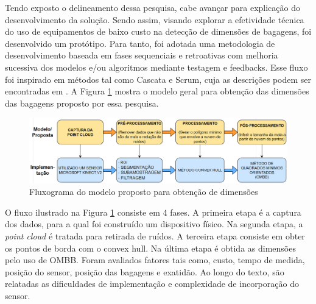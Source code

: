 
    Tendo exposto o delineamento dessa pesquisa, cabe avançar para explicação do desenvolvimento da solução. Sendo assim, visando explorar a efetividade técnica do uso de equipamentos de baixo custo na detecção de dimensões de bagagens, foi desenvolvido um protótipo. Para tanto, foi adotada uma metodologia de desenvolvimento baseada em fases sequenciais e retroativas com melhoria sucessiva dos modelos e/ou algoritmos mediante testagem e feedbacks. Esse fluxo foi inspirado em métodos tal como Cascata e Scrum, cuja as descrições podem ser encontradas em \cite{bourque_2015_guide}. A Figura \ref{fig:fluxogramaModeloPropostoObtencaoDimensoes} mostra o modelo geral para obtenção das dimensões das bagagens proposto por essa pesquisa.


        \begin{figure}[h]
           \centering
           \includegraphics[width=1\textwidth]{imagens/fluxogramaModeloPropostoObtencaoDimensoes.png} 
           \caption{Fluxograma do modelo proposto para obtenção de dimensões}
          \label{fig:fluxogramaModeloPropostoObtencaoDimensoes}
        \end{figure}

    O fluxo ilustrado na Figura \ref{fig:fluxogramaModeloPropostoObtencaoDimensoes} consiste em 4 fases. A primeira etapa é a captura dos dados, para a qual foi construído um dispositivo físico. Na segunda etapa, a \textit{point cloud} é tratada para retirada de ruídos. A terceira etapa consiste em obter os pontos de borda com o convex hull. Na última etapa é obtida as dimensões pelo uso de OMBB. Foram avaliados fatores tais como, custo, tempo de medida, posição do sensor, posição das bagagens e exatidão. Ao longo do texto, são relatadas as dificuldades de implementação e complexidade de incorporação do sensor. 
    
